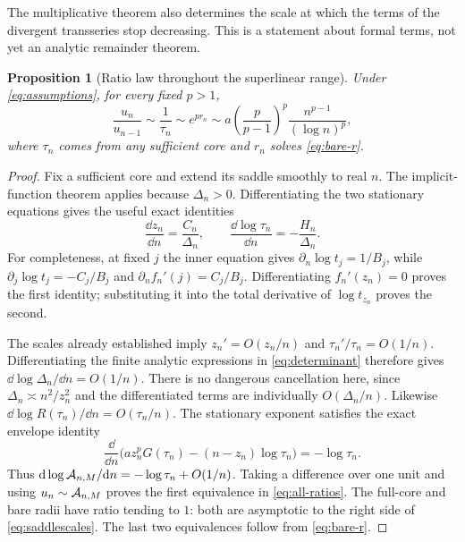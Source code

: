 \documentclass[11pt,a4paper]{article}
\numberwithin{equation}{section}
\newtheorem{proposition}[theorem]{Proposition}
\theoremstyle{definition}
\theoremstyle{remark}
\begin{document}
The multiplicative theorem also determines the scale at which the terms
of the divergent transseries stop decreasing. This is a statement about
formal terms, not yet an analytic remainder theorem.

\begin{proposition}[Ratio law throughout the superlinear range]
\label{prop:all-ratios}
Under \eqref{eq:assumptions}, for every fixed $p>1$,
\begin{equation}
 \frac{u_n}{u_{n-1}}\sim\frac1{\tau_n}
 \sim e^{pr_n}
 \sim a\left(\frac p{p-1}\right)^p
           \frac{n^{p-1}}{(\log n)^p},
 \label{eq:all-ratios}
\end{equation}
where $\tau_n$ comes from any sufficient core and $r_n$ solves
\eqref{eq:bare-r}.
\end{proposition}

\begin{proof}
Fix a sufficient core and extend its saddle smoothly to real $n$.
The implicit-function theorem applies because $\Delta_n>0$.
Differentiating the two stationary equations gives the useful exact identities
\begin{equation}
 \frac{\dd z_n}{\dd n}=\frac{C_n}{\Delta_n},\qquad
 \frac{\dd\log\tau_n}{\dd n}=-\frac{H_n}{\Delta_n}.
 \label{eq:saddle-motion}
\end{equation}
For completeness, at fixed $j$ the inner equation gives
$\partial_n\log t_j=1/B_j$, while
$\partial_j\log t_j=-C_j/B_j$ and
$\partial_n f_n'(j)=C_j/B_j$. Differentiating
$f_n'(z_n)=0$ proves the first identity; substituting it into the total
derivative of $\log t_{z_n}$ proves the second.

The scales already established imply
$z_n'=O(z_n/n)$ and $\tau_n'/\tau_n=O(1/n)$.
Differentiating the finite analytic expressions in
\eqref{eq:determinant} therefore gives
$\dd\log\Delta_n/\dd n=O(1/n)$. There is no dangerous cancellation
here, since $\Delta_n\asymp n^2/z_n^2$ and the differentiated terms
are individually $O(\Delta_n/n)$. Likewise
$\dd\log R(\tau_n)/\dd n=O(\tau_n/n)$.
The stationary exponent satisfies the exact envelope identity
\[
 \frac{\dd}{\dd n}
 \bigl(a z_n^pG(\tau_n)-(n-z_n)\log\tau_n\bigr)
 =-\log\tau_n.
\]
Thus $\mathrm d\log\mathcal A_{n,M}/\mathrm d n=-\log\tau_n+O(1/n)$.
Taking a difference over one unit and using $u_n\sim\mathcal A_{n,M}$ proves
the first equivalence in \eqref{eq:all-ratios}.
The full-core and bare radii have ratio tending to $1$: both are
asymptotic to the right side of \eqref{eq:saddlescales}. The last two
equivalences follow from \eqref{eq:bare-r}.
\end{proof}
\end{document}
